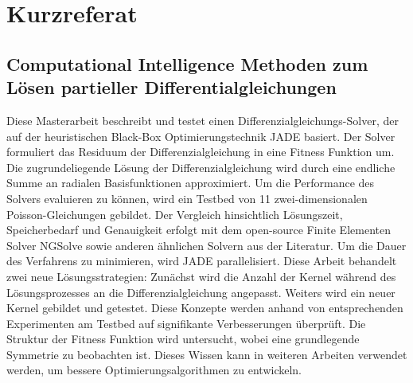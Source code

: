 \documentclass[./\jobname.tex]{subfiles}
\begin{document}
\setcounter{page}{2}
\chapter*{Kurzreferat}
\section*{Computational Intelligence Methoden zum Lösen partieller Differentialgleichungen}
%
Diese Masterarbeit beschreibt und testet einen Differenzialgleichungs-Solver, der auf der heuristischen Black-Box Optimierungstechnik JADE basiert. Der Solver formuliert das Residuum der Differenzialgleichung in eine Fitness Funktion um. Die zugrundeliegende Lösung der Differenzialgleichung wird durch eine endliche Summe an radialen Basisfunktionen approximiert. Um die Performance des Solvers evaluieren zu können, wird ein Testbed von 11 zwei-dimensionalen Poisson-Gleichungen gebildet. Der Vergleich hinsichtlich Lösungszeit, Speicherbedarf und Genauigkeit erfolgt mit dem open-source Finite Elementen Solver NGSolve sowie anderen ähnlichen Solvern aus der Literatur. Um die Dauer des Verfahrens zu minimieren, wird JADE parallelisiert. Diese Arbeit behandelt zwei neue Lösungsstrategien: Zunächst wird die Anzahl der Kernel während des Lösungsprozesses an die Differenzialgleichung angepasst. Weiters wird ein neuer Kernel gebildet und getestet. Diese Konzepte werden anhand von entsprechenden Experimenten am Testbed auf signifikante Verbesserungen überprüft. Die Struktur der Fitness Funktion wird untersucht, wobei eine grundlegende Symmetrie zu beobachten ist. Dieses Wissen kann in weiteren Arbeiten verwendet werden, um bessere Optimierungsalgorithmen zu entwickeln. 
%
\end{document}
